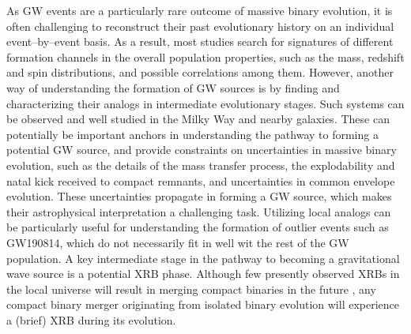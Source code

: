 \documentclass[linenumbers,trackchanges,twocolumn]{aastex701}
\begin{document}
As GW events are a particularly rare outcome of massive binary evolution, it is often challenging to reconstruct their past evolutionary history on an individual  event--by--event basis. As a result, most studies search for signatures of different formation channels in the overall population properties, such as the mass, redshift and spin distributions, and possible correlations among them. However, another way of understanding the formation of GW sources is by finding and characterizing their analogs in intermediate evolutionary stages. Such systems can be observed and well studied in the Milky Way and nearby galaxies. These can potentially be important anchors in understanding the pathway to forming a potential GW source, and provide constraints on uncertainties in massive binary evolution, such as the details of the mass transfer process, the explodability and natal kick received to compact remnants, and uncertainties in common envelope evolution. These uncertainties propagate in forming a GW source, which makes their astrophysical interpretation a challenging task. Utilizing local analogs can be particularly useful for understanding the formation of outlier events such as GW190814, which do not necessarily fit in well wit the rest of the GW population. A key intermediate stage in the pathway to becoming a gravitational wave source is a potential XRB phase. Although few presently observed XRBs in the local universe will result in merging compact binaries in the future \citep{2006ARA&A..44...49R, 2022ApJ...929L..26F}, any compact binary merger originating from isolated binary evolution will experience a (brief) XRB during its evolution. 
\end{document}
